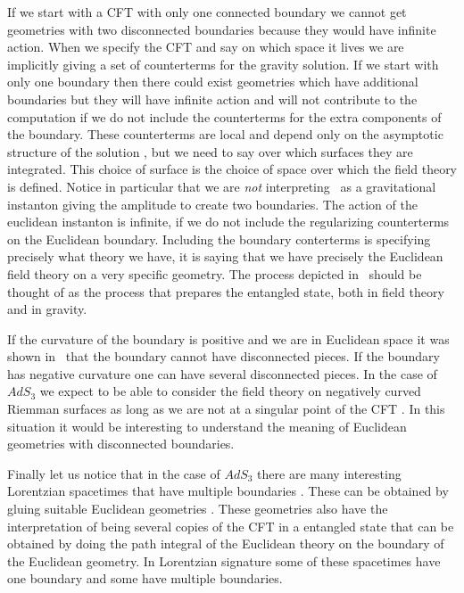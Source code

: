 If we start with a CFT with only one connected 
boundary we cannot get geometries
with two disconnected 
boundaries because they would have infinite action. When we
specify the CFT and say on which  space it lives we are implicitly 
giving a set of counterterms for the gravity solution. If we start with
only one boundary then there could exist  geometries which have additional 
boundaries but they will have infinite action and will not contribute 
to the computation if we do not include the counterterms for the extra
components of the boundary. These counterterms are local  and 
depend only on the asymptotic structure of the solution 
, but we need to say over which surfaces they
are integrated. This choice of surface is the choice of space over
which the field theory is defined. 
Notice in particular that we are {\it not} interpreting \gluing\ as
a gravitational instanton giving the amplitude to create two boundaries.
The action of the euclidean  instanton is infinite, if we do not include the 
regularizing counterterms on the Euclidean boundary. Including the 
boundary conterterms is specifying precisely what theory we have, it is 
saying that we 
 have precisely the Euclidean field theory on a very specific
geometry. 
The process
depicted in \gluing\ should be thought of as the process that prepares the
entangled state, both in field theory and in gravity. 

If the curvature
of the boundary is positive and we are in  Euclidean space 
it was shown in \wittenyau\ that the boundary cannot have disconnected
pieces. If the boundary has negative curvature one can have several 
disconnected pieces. In the case of $AdS_3$ we expect to be able to 
consider the field theory on negatively curved Riemman surfaces as
long as we are not at a singular point of the CFT \swsingular . In this
situation it would be interesting to understand the meaning of
Euclidean geometries with disconnected boundaries. 

Finally let us notice that in the case of $AdS_3$ 
there are many interesting Lorentzian 
spacetimes that have multiple boundaries \multiple . These can 
be obtained by gluing suitable Euclidean geometries \krasnov .
These geometries also have the interpretation of being several
copies of the CFT in a entangled  state that can be obtained
by doing the path integral of the Euclidean theory on the boundary 
of the Euclidean geometry. In Lorentzian signature some of these
spacetimes have one boundary and some have multiple boundaries. 

